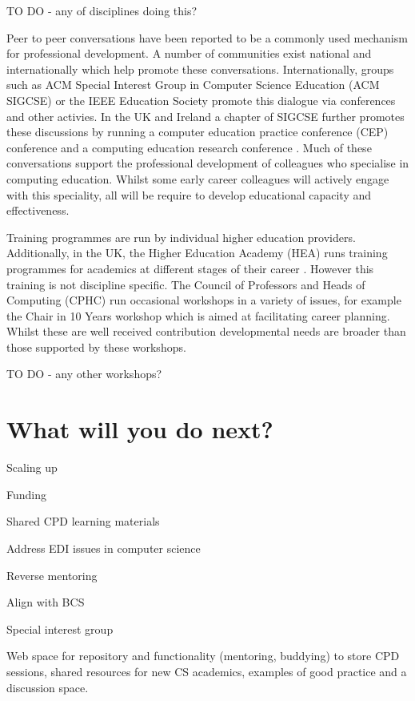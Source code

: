 \documentclass[sigconf]{acmart}
\begin{document}
TO DO - any of disciplines doing this?

Peer to peer conversations have been reported to be a commonly used mechanism for professional development\cite{King2004}. A number of communities exist national and internationally which help promote these conversations. Internationally, groups such as ACM Special Interest Group in Computer Science Education (ACM SIGCSE) \cite{SIGCSE} or the IEEE Education Society \cite{IEEEES} promote this dialogue via conferences and other activies.  In the UK and Ireland a chapter of SIGCSE \cite{UKI-SIGCSE} further promotes these discussions by running a computer education practice conference (CEP) conference \cite{CEP} and a computing education research conference \cite{UKICER}. Much of these conversations support the professional development of colleagues who specialise in computing education. Whilst some early career colleagues will actively engage with this speciality, all will be require to develop educational capacity and effectiveness.
 
Training programmes are run by individual higher education providers. Additionally, in the UK, the Higher Education Academy (HEA) runs training programmes for academics at different stages of their career \cite{HEATraining}. However this training is not discipline specific. The Council of Professors and Heads of Computing (CPHC) run occasional workshops in a variety of issues, for example the Chair in 10 Years workshop which is aimed at facilitating career planning. Whilst these are well received contribution developmental needs are broader than those supported by these workshops.

TO DO - any other workshops?

\section{What will you do next?}

Scaling up


Funding 


Shared CPD learning materials


Address EDI issues in computer science


Reverse mentoring


Align with BCS


Special interest group

Web space for repository and functionality (mentoring, buddying) to store CPD sessions, shared resources for new CS academics, examples of good practice and a discussion space.
\end{document}
